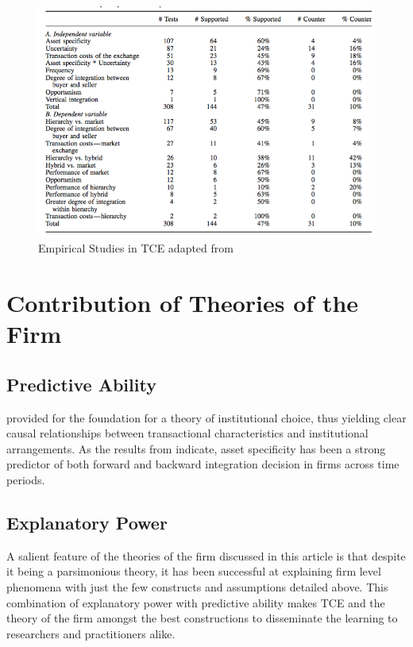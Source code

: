 \documentclass[12pt]{article}
\begin{document}
\begin{figure}[h]
\begin{centering}
  \includegraphics[width=\textwidth]{Results}
  \caption{Empirical Studies in TCE adapted from \cite{David2004}}
   \label{fig:Results}
\end{centering}
\end{figure}

\section{Contribution of Theories of the Firm}
\subsection{Predictive Ability}
\cite{Williamson1975} provided for the foundation for a theory of institutional choice, thus yielding clear causal relationships between transactional characteristics and institutional arrangements. As the results from \cite{David2004} indicate, asset specificity has been a strong predictor of both forward and backward integration decision in firms across time periods.

\subsection{Explanatory Power}
A salient feature of the theories of the firm discussed in this article is that despite it being a parsimonious theory, it has been successful at explaining firm level phenomena with just the few constructs and assumptions detailed above. This combination of explanatory power with predictive ability makes TCE and the theory of the firm amongst the best constructions to disseminate the learning to researchers and practitioners alike.
\end{document}
